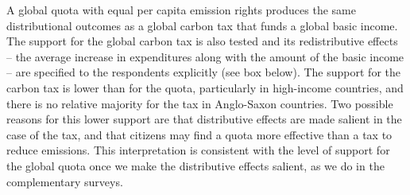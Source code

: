 \documentclass{nature}
\begin{document}
A global quota with equal per capita emission rights produces the same distributional outcomes as a global carbon tax that funds a global basic income. %
The support for the global carbon tax is also tested and its redistributive effects --  the average increase in expenditures along with the amount of the basic income -- are specified to the respondents explicitly (see box below). %
The support for the carbon tax is lower than for the quota, particularly in high-income countries, and there is no relative majority for the tax in Anglo-Saxon countries. %
Two possible reasons for this lower support are that distributive effects are made salient in the case of the tax, and that citizens may find a quota more effective than a tax to reduce emissions. This interpretation is consistent with the level of support for the global quota once we make the distributive effects salient, as we do in the complementary surveys.


\end{document}
